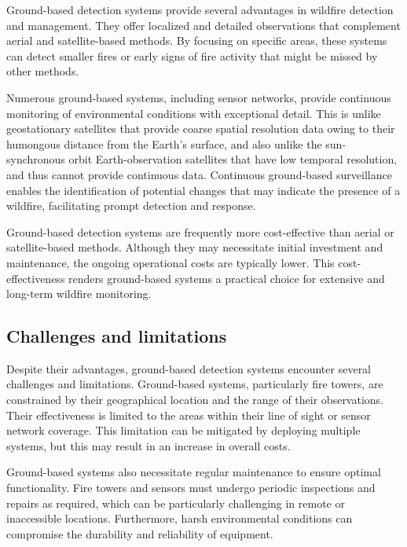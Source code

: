 \documentclass[
  12 pt,
]{Nemilov}
\begin{document}
Ground-based detection systems provide several advantages in wildfire detection and management. They offer localized and detailed observations that complement aerial and satellite-based methods. By focusing on specific areas, these systems can detect smaller fires or early signs of fire activity that might be missed by other methods.

Numerous ground-based systems, including sensor networks, provide continuous monitoring of environmental conditions with exceptional detail. This is unlike geostationary satellites that provide coarse spatial resolution data owing to their humongous distance from the Earth's surface, and also unlike the sun-synchronous orbit Earth-observation satellites that have low temporal resolution, and thus cannot provide continuous data. Continuous ground-based surveillance enables the identification of potential changes that may indicate the presence of a wildfire, facilitating prompt detection and response.

Ground-based detection systems are frequently more cost-effective than aerial or satellite-based methods. Although they may necessitate initial investment and maintenance, the ongoing operational costs are typically lower. This cost-effectiveness renders ground-based systems a practical choice for extensive and long-term wildfire monitoring.

\subsection{Challenges and limitations}\label{challenges-and-limitations-2}

Despite their advantages, ground-based detection systems encounter several challenges and limitations. Ground-based systems, particularly fire towers, are constrained by their geographical location and the range of their observations. Their effectiveness is limited to the areas within their line of sight or sensor network coverage. This limitation can be mitigated by deploying multiple systems, but this may result in an increase in overall costs.

Ground-based systems also necessitate regular maintenance to ensure optimal functionality. Fire towers and sensors must undergo periodic inspections and repairs as required, which can be particularly challenging in remote or inaccessible locations. Furthermore, harsh environmental conditions can compromise the durability and reliability of equipment.
\end{document}
